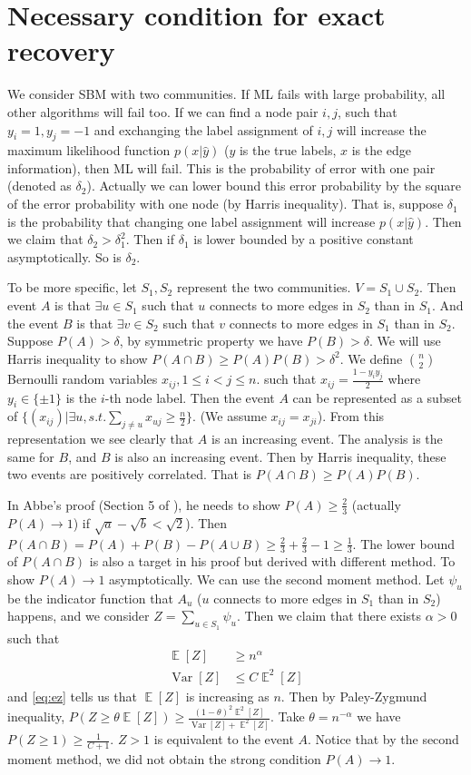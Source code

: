 \documentclass{article}
\DeclareMathOperator{\Var}{Var}
\DeclareMathOperator{\E}{\mathbb{E}}
\begin{document}
\section{Necessary condition for exact recovery}
We consider SBM with two communities.
If ML fails with large probability,
all other algorithms will fail too. If we can find
a node pair $i,j$, such that $y_i=1, y_j=-1$ and
exchanging the label assignment of $i,j$ will increase
the maximum likelihood function $p(x|\hat{y})$ ($y$ is the
true labels, $x$ is the edge information),
then ML will fail. This is the probability of error
with one pair (denoted as $\delta_2$).
Actually we can lower bound this error
probability by the square of the error probability
with one node (by Harris inequality).
That is, suppose $\delta_1$ is the probability that
changing one label assignment will increase
$p(x|\hat{y})$.
Then we claim that
$\delta_2 > \delta_1^2$. Then if $\delta_1$ is lower bounded by a positive
constant asymptotically. So is $\delta_2$.

To be more specific, let $S_1,
S_2$ represent the two communities.
$V=S_1\cup S_2$.
Then event $A$ is that
$\exists u \in S_1$ such that $u$ connects
to more edges in $S_2$ than in $S_1$.
And the event $B$ is that
$\exists v \in S_2$
such that $v$ connects
to more edges in $S_1$ than in $S_2$.
Suppose $P(A)>\delta$, by symmetric property
we have $P(B)>\delta$. We will use
Harris inequality \cite{hi} to show $P(A\cap B)
\geq P(A)P(B) > \delta^2$.
We define $\binom{n}{2}$ Bernoulli random
variables $x_{ij}, 1\leq i < j\leq n$. such that
$x_{ij}=\frac{1 - y_iy_j}{2}$ where $y_i \in \{\pm 1\}$
is the $i$-th node label. Then the event
$A$ can be represented as a subset of
$\{(x_{ij})| \exists u, s.t. \sum_{j\neq u} x_{uj} \geq \frac{n}{2}\}$.
(We assume $x_{ij}=x_{ji}$). From this
representation we see clearly that $A$
is an increasing event. The analysis
is the same for $B$, and $B$
is also an increasing event. Then
by Harris inequality, these two
events are positively correlated.
That is $P(A\cap B)
\geq P(A)P(B)$.

In Abbe's proof (Section 5 of \cite{abbe}), he needs to show
$P(A) \geq \frac{2}{3}$ (actually $P(A)\to 1$)
if $\sqrt{a} - \sqrt{b} < \sqrt{2}$).
Then $P(A\cap B) = P(A)
+ P(B) - P(A\cup B) \geq \frac{2}{3}
+ \frac{2}{3} - 1 \geq \frac{1}{3}
$. The lower bound of $P(A\cap B)$ is
also a target in his proof but derived
with different method.
To show $P(A) \to 1$ asymptotically.
We can use the second moment method.
Let $\psi_u$ be the indicator function
that $A_u$ ($u$ connects to more edges
in $S_1$ than in $S_2$) happens, and we consider
$Z=\sum_{u \in S_1} \psi_u$.
Then we claim that there exists $\alpha >
0$ such that
\begin{align}\label{eq:ez}
	\E[Z] &\geq n^{\alpha} \\
	\Var[Z] &\leq C\E^2[Z]
	\label{eq:varz}
\end{align}
and
\eqref{eq:ez} tells us that
$\E[Z]$ is increasing as $n$. Then
by Paley-Zygmund inequality,
$P(Z \geq \theta \E[Z])
\geq \frac{(1-\theta)^2\E^2[Z]}{\Var[Z]
+ \E^2[Z]}$.
Take $\theta = n^{-\alpha}$ we have
$P(Z \geq 1) \geq \frac{1}{C + 1}$.
$Z>1$ is equivalent
to the event $A$.
Notice that by the second moment method,
we did not obtain the strong condition $P(A) \to 1$.
\end{document}
